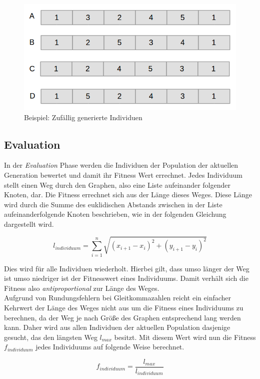 \documentclass[12pt,a4paper]{scrreprt}
\begin{document}
\begin{figure}[ht]
  	\centering
	\includegraphics[width=400pt]{images/algo_02_init.png}
	\caption{Beispiel: Zufällig generierte Individuen}
	\label{fig:algo-sample-individuals}
\end{figure}

\subsection{Evaluation}
\label{subsec:evaluation}

In der \textit{Evaluation} Phase werden die Individuen der Population der aktuellen Generation bewertet und damit ihr Fitness Wert errechnet. Jedes Individuum stellt einen Weg durch den Graphen, also eine Liste aufeinander folgender Knoten, dar. Die Fitness errechnet sich aus der Länge dieses Weges. Diese Länge wird durch die Summe des euklidischen Abstands zwischen in der Liste aufeinanderfolgende Knoten beschrieben, wie in der folgenden Gleichung dargestellt wird.

$$
l_{individuum} = \sum_{i=1}^{n} \sqrt{(x_{i+1} - x_i)^2 + (y_{i+1} - y_i)^2}
$$

Dies wird für alle Individuen wiederholt. Hierbei gilt, dass umso länger der Weg ist umso niedriger ist der Fitnesswert eines Individuums. Damit verhält sich die Fitness also \textit{antiproportional} zur Länge des Weges.\\
Aufgrund von Rundungsfehlern bei Gleitkommazahlen reicht ein einfacher Kehrwert der Länge des Weges nicht aus um die Fitness eines Individuums zu berechnen, da der Weg je nach Größe des Graphen entsprechend lang werden kann. Daher wird aus allen Individuen der aktuellen Population dasjenige gesucht, das den längsten Weg $l_{max}$ besitzt. Mit diesem Wert wird nun die Fitness $f_{individuum}$ jedes Individuums auf folgende Weise berechnet.

$$
f_{individuum} = \frac{l_{max}}{l_{individuum}}
$$
\end{document}
